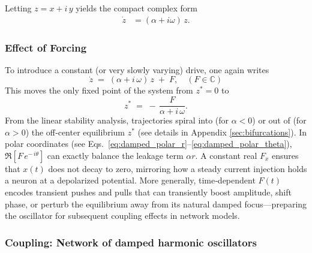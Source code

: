 \documentclass[12pt]{article}
\numberwithin{equation}{section}
\begin{document}
Letting \( z = x + i\,y \) yields the compact complex form
\begin{align}
    \dot{z} &= (\alpha + i\omega)\,z. \label{eq:damped_complex}
\end{align}


\subsubsection{Effect of Forcing}
 To introduce a constant (or very slowly varying) drive, one again writes
\begin{equation}
    \dot z \;=\; (\alpha + i\,\omega)\,z \;+\; F, \quad  (F\in\mathbb{C})
\end{equation}
This moves the only fixed point of the system from \(z^*=0\) to 
\begin{equation}
    z^{*} \;=\; -\,\frac{F}{\alpha + i\,\omega}.
\end{equation}
From the linear stability analysis, trajectories spiral into (for \(\alpha < 0\)) or out of (for \(\alpha>0\)) the off‐center equilibrium \(z^{*}\) (see details in Appendix \ref{sec:bifurcations}).  In polar coordinates (see Eqs.~\eqref{eq:damped_polar_r}–\eqref{eq:damped_polar_theta}), \(\Re[F\,e^{-\,i\theta}]\) can exactly balance the leakage term \(\alpha r\). A constant real \(F_x\) ensures that \(x(t)\) does not decay to zero, mirroring how a steady current injection holds a neuron at a depolarized potential.  More generally, time‐dependent \(F(t)\) encodes transient pushes and pulls that can transiently boost amplitude, shift phase, or perturb the equilibrium away from its natural damped focus—preparing the oscillator for subsequent coupling effects in network models.

 

 
\subsubsection{Coupling: Network of  damped harmonic oscillators}
\end{document}
